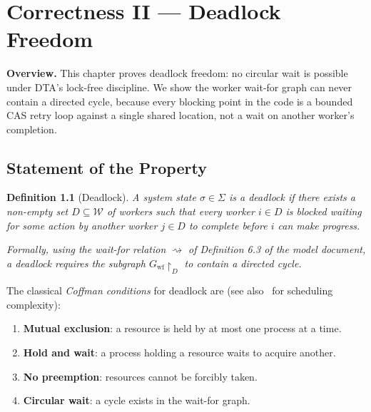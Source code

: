 \documentclass[11pt,a4paper]{report}
\newtheorem{definition}{Definition}[section]
\begin{document}

\chapter{Correctness II --- Deadlock Freedom}
\label{chap:deadlock}

\bigskip
\noindent\textbf{Overview.}
This chapter proves deadlock freedom: no circular wait is possible
under DTA's lock-free discipline. We show the worker wait-for graph
can never contain a directed cycle, because every blocking point in
the code is a bounded CAS retry loop against a single shared
location, not a wait on another worker's completion.


\section{Statement of the Property}

\begin{definition}[Deadlock]
\label{def:deadlock}
A system state $\sigma \in \Sigma$ is a \emph{deadlock} if there
exists a non-empty set $D \subseteq \mathcal{W}$ of workers such that
every worker $i \in D$ is blocked waiting for some action by another
worker $j \in D$ to complete before $i$ can make progress.

Formally, using the wait-for relation $\rightsquigarrow$ of
Definition 6.3 of the model document, a deadlock requires the
subgraph $G_{\text{wf}}\!\upharpoonright_D$ to contain a directed
cycle.
\end{definition}

The classical \emph{Coffman conditions} for deadlock are (see also~\cite{lenstra1978} for scheduling complexity):
\begin{enumerate}
  \item \textbf{Mutual exclusion}: a resource is held by at most one
        process at a time.
  \item \textbf{Hold and wait}: a process holding a resource waits to
        acquire another.
  \item \textbf{No preemption}: resources cannot be forcibly taken.
  \item \textbf{Circular wait}: a cycle exists in the wait-for graph.
\end{enumerate}
\end{document}
